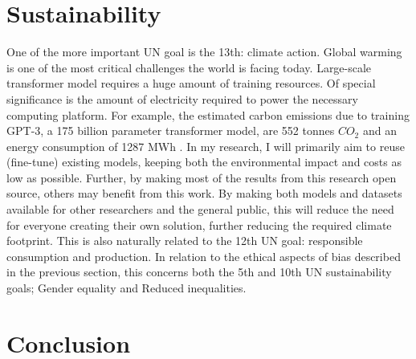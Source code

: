 \documentclass{article}
\begin{document}
\section{Sustainability}
One of the more important UN goal is the 13th: climate action. Global warming is one of the most critical challenges the world is facing today. Large-scale transformer model requires a huge amount of training resources. Of special significance is the amount of electricity required to power the necessary computing platform. For example, the estimated carbon emissions due to training GPT-3, a 175 billion parameter transformer model, are 552 tonnes $CO_2$ and an energy consumption of 1287 MWh \cite{patterson2021carbon}. In my research, I will primarily aim to reuse (fine-tune) existing models, keeping both the environmental impact and costs as low as possible. Further, by making most of the results from this research open source, others may benefit from this work. By making both models and datasets available for other researchers and the general public, this will reduce the need for everyone creating their own solution, further reducing the required climate footprint. This is also naturally related to the 12th UN goal: responsible consumption and production. In relation to the ethical aspects of bias described in the previous section, this concerns both the 5th and 10th UN sustainability goals; Gender equality and Reduced inequalities.

\section{Conclusion}


%
\vspace{1cm}
\newpage
\printbibliography
\end{document}
